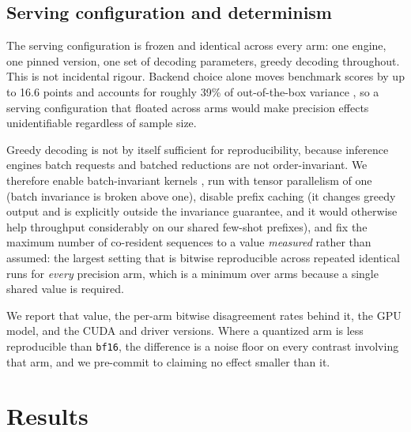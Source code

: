 \documentclass[conference]{IEEEtran}
\newcommand{\todo}[1]{\textcolor{red}{[\textbf{TODO:} #1]}}
\begin{document}
\subsection{Serving configuration and determinism}
\label{sec:determinism}
The serving configuration is frozen and identical across every arm: one engine,
one pinned version, one set of decoding parameters, greedy decoding throughout.
This is not incidental rigour. Backend choice alone moves benchmark scores by up
to 16.6 points \citep{pape2026silent} and accounts for roughly 39\% of
out-of-the-box variance \citep{masoudian2026sideeffect}, so a serving
configuration that floated across arms would make precision effects
unidentifiable regardless of sample size.

Greedy decoding is not by itself sufficient for reproducibility, because
inference engines batch requests and batched reductions are not
order-invariant. We therefore enable batch-invariant kernels \citep{he2025nondeterminism},
run with tensor
parallelism of one (batch invariance is broken above one), disable prefix
caching (it changes greedy output and is explicitly outside the invariance
guarantee, and it would otherwise help throughput considerably on our shared
few-shot prefixes), and fix the maximum number of co-resident sequences to a
value \emph{measured} rather than assumed: the largest setting that is bitwise
reproducible across repeated identical runs for \emph{every} precision arm, which
is a minimum over arms because a single shared value is required.

We report that value, the per-arm bitwise disagreement rates behind it, the GPU
model, and the CUDA and driver versions. Where a quantized arm is less
reproducible than \texttt{bf16}, the difference is a noise floor on every
contrast involving that arm, and we pre-commit to claiming no effect smaller
than it.

\section{Results}
\label{sec:results}
%
\end{document}
